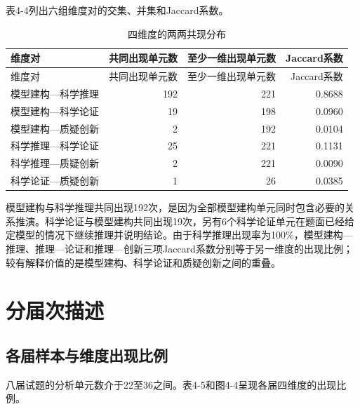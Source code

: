 \documentclass[
  12pt,
  a4paper,twoside,openany]{ctexbook}
\begin{document}
表4-4列出六组维度对的交集、并集和Jaccard系数。

\begin{longtable}[]{@{}lrrr@{}}
\caption{四维度的两两共现分布}\tabularnewline
\toprule\noalign{}
\rowcolor{ThesisPale}
维度对 & 共同出现单元数 & 至少一维出现单元数 & Jaccard系数 \\
\midrule\noalign{}
\endfirsthead
\toprule\noalign{}
\rowcolor{ThesisPale}
维度对 & 共同出现单元数 & 至少一维出现单元数 & Jaccard系数 \\
\midrule\noalign{}
\endhead
\bottomrule\noalign{}
\endlastfoot
模型建构---科学推理 & 192 & 221 & 0.8688 \\
模型建构---科学论证 & 19 & 198 & 0.0960 \\
模型建构---质疑创新 & 2 & 192 & 0.0104 \\
科学推理---科学论证 & 25 & 221 & 0.1131 \\
科学推理---质疑创新 & 2 & 221 & 0.0090 \\
科学论证---质疑创新 & 1 & 26 & 0.0385 \\
\end{longtable}

模型建构与科学推理共同出现192次，是因为全部模型建构单元同时包含必要的关系推演。科学论证与模型建构共同出现19次，另有6个科学论证单元在题面已经给定模型的情况下继续推理并说明结论。由于科学推理出现率为100\%，模型建构---推理、推理---论证和推理---创新三项Jaccard系数分别等于另一维度的出现比例；较有解释价值的是模型建构、科学论证和质疑创新之间的重叠。

\section{分届次描述}\label{ux5206ux5c4aux6b21ux63cfux8ff0}

\subsection{各届样本与维度出现比例}\label{ux5404ux5c4aux6837ux672cux4e0eux7ef4ux5ea6ux51faux73b0ux6bd4ux4f8b}

八届试题的分析单元数介于22至36之间。表4-5和图4-4呈现各届四维度的出现比例。
\end{document}
